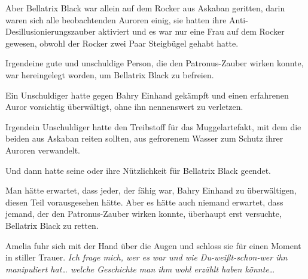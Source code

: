 Aber Bellatrix Black war allein auf dem Rocker aus Askaban geritten, darin waren sich alle beobachtenden Auroren einig, sie hatten ihre Anti-Desillusionierungszauber aktiviert und es war nur eine Frau auf dem Rocker gewesen, obwohl der Rocker zwei Paar Steigbügel gehabt hatte.

Irgendeine gute und unschuldige Person, die den Patronus-Zauber wirken konnte, war hereingelegt worden, um Bellatrix Black zu befreien.

Ein Unschuldiger hatte gegen Bahry Einhand gekämpft und einen erfahrenen Auror vorsichtig überwältigt, ohne ihn nennenswert zu verletzen.

Irgendein Unschuldiger hatte den Treibstoff für das Muggelartefakt, mit dem die beiden aus Askaban reiten sollten, aus gefrorenem Wasser zum Schutz ihrer Auroren verwandelt.

Und dann hatte seine oder ihre Nützlichkeit für Bellatrix Black geendet.

Man hätte erwartet, dass jeder, der fähig war, Bahry Einhand zu überwältigen, diesen Teil vorausgesehen hätte. Aber es hätte auch niemand erwartet, dass jemand, der den Patronus-Zauber wirken konnte, überhaupt erst versuchte, Bellatrix Black zu retten.

Amelia fuhr sich mit der Hand über die Augen und schloss sie für einen Moment in stiller Trauer. \emph{Ich frage mich, wer es war und wie Du-weißt-schon-wer ihn manipuliert hat… welche Geschichte man ihm wohl erzählt haben könnte}…

